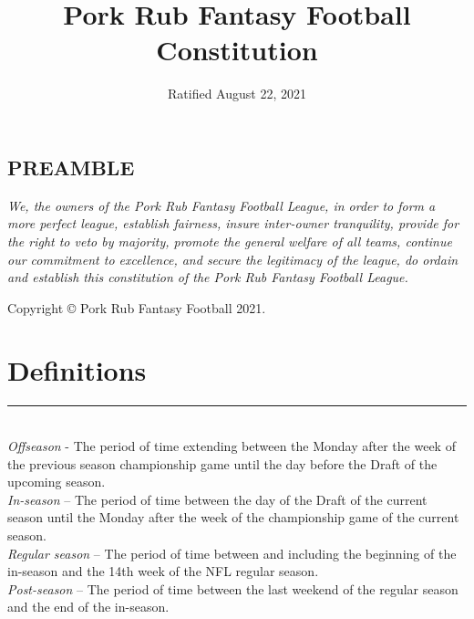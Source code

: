 \documentclass{article}
\title{Pork Rub Fantasy Football Constitution}
\date{Ratified August 22, 2021}
\begin{document}
\begin{titlepage}
    \maketitle
    \thispagestyle{empty}
\end{titlepage}
\begin{center}
    \section{PREAMBLE}
\end{center}
\noindent\textit{We, the owners of the Pork Rub Fantasy Football League, in order to form a more perfect league, establish fairness, insure inter-owner tranquility, provide for the right to veto by majority, promote the general welfare of all teams, continue our commitment to excellence, and secure the legitimacy of the league, do ordain and establish this constitution of the Pork Rub Fantasy Football League.}

\newpage
\begin{center}
    Copyright \copyright{} Pork Rub Fantasy Football 2021.
\end{center}

\newpage
\tableofcontents
\newpage

\section{Definitions}

    \noindent\rule{\textwidth}{0.5pt}\\

    \noindent\textit{Offseason} - The period of time extending between the Monday after the week of the previous season championship game until the day before the Draft of the upcoming season.\\

    \noindent\textit{In-season} – The period of time between the day of the Draft of the current season until the Monday after the week of the championship game of the current season.\\
    \noindent\textit{Regular season} – The period of time between and including the beginning of the in-season and the 14th week of the NFL regular season.\\

    \noindent\textit{Post-season} – The period of time between the last weekend of the regular season and the end of the in-season.\\
\end{document}
